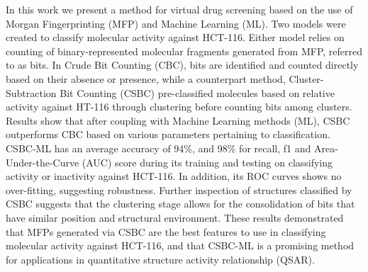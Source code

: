 In this work we present a method for virtual drug screening based on the use of Morgan Fingerprinting (MFP) and Machine Learning (ML). Two models were created to classify molecular activity against HCT-116. Either model relies on counting of binary-represented molecular fragments generated from MFP, referred to as bits. In Crude Bit Counting (CBC), bits are identified and counted directly based on their absence or presence, while a counterpart method, Cluster-Subtraction Bit Counting (CSBC) pre-classified molecules based on relative activity against HT-116 through clustering before counting bits among clusters. Results show that after coupling with Machine Learning methods (ML), CSBC outperforms CBC based on various parameters pertaining to classification. CSBC-ML has an average accuracy of 94\%, and 98\% for recall, f1 and Area-Under-the-Curve (AUC) score during its training and testing on classifying activity or inactivity against HCT-116. In addition, its ROC curves shows no over-fitting, suggesting robustness. Further inspection of structures classified by CSBC suggests that the clustering stage allows for the consolidation of bits that have similar position and structural environment. These results demonstrated that MFPs generated via CSBC are the best features to use in classifying molecular activity against HCT-116, and that CSBC-ML is a promising method for applications in quantitative structure activity relationship (QSAR).





